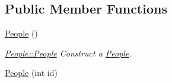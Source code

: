 \subsection*{Public Member Functions}
\begin{DoxyCompactItemize}
\item 
\hypertarget{classModels_1_1People_acdd7ec9d2f9815aeb230ca450cbcdbe3}{\hyperlink{classModels_1_1People_acdd7ec9d2f9815aeb230ca450cbcdbe3}{People} ()}\label{classModels_1_1People_acdd7ec9d2f9815aeb230ca450cbcdbe3}

\begin{DoxyCompactList}\small\item\em \hyperlink{classModels_1_1People_acdd7ec9d2f9815aeb230ca450cbcdbe3}{People\-::\-People} Construct a \hyperlink{classModels_1_1People}{People}. \end{DoxyCompactList}\item 
\hypertarget{classModels_1_1People_a0b260c5c0d9b0305fb6da820974a7aa8}{\hyperlink{classModels_1_1People_a0b260c5c0d9b0305fb6da820974a7aa8}{People} (int id)}\label{classModels_1_1People_a0b260c5c0d9b0305fb6da820974a7aa8}


\end{DoxyCompactItemize}
